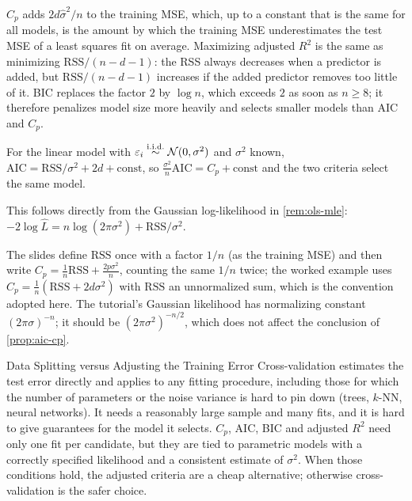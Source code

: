 $C_p$ adds $2d\hat\sigma^2/n$ to the training MSE, which, up to a constant that is the same for all models, is the amount by which the training MSE underestimates the test MSE of a least squares fit on average. Maximizing adjusted $R^2$ is the same as minimizing $\mathrm{RSS}/(n-d-1)$: the RSS always decreases when a predictor is added, but $\mathrm{RSS}/(n-d-1)$ increases if the added predictor removes too little of it. BIC replaces the factor $2$ by $\log n$, which exceeds $2$ as soon as $n\ge8$; it therefore penalizes model size more heavily and selects smaller models than AIC and $C_p$.

\begin{proposition}\label{prop:aic-cp}
For the linear model with $\varepsilon_i\stackrel{\mathrm{i.i.d.}}{\sim}\mathcal{N}(0,\sigma^2)$ and $\sigma^2$ known, $\mathrm{AIC}=\mathrm{RSS}/\sigma^2+2d+\text{const}$, so $\frac{\sigma^2}{n}\mathrm{AIC}=C_p+\text{const}$ and the two criteria select the same model.
\end{proposition}

This follows directly from the Gaussian log-likelihood in \cref{rem:ols-mle}: $-2\log\hat L=n\log(2\pi\sigma^2)+\mathrm{RSS}/\sigma^2$.

\begin{remark}
The slides define $\mathrm{RSS}$ once with a factor $1/n$ (as the training MSE) and then write $C_p=\frac1n\mathrm{RSS}+\frac{2p\sigma^2}{n}$, counting the same $1/n$ twice; the worked example uses $C_p=\frac1n(\mathrm{RSS}+2d\sigma^2)$ with $\mathrm{RSS}$ an unnormalized sum, which is the convention adopted here. The tutorial's Gaussian likelihood has normalizing constant $(2\pi\sigma)^{-n}$; it should be $(2\pi\sigma^2)^{-n/2}$, which does not affect the conclusion of \cref{prop:aic-cp}.
\end{remark}

\begin{notebox}{Data Splitting versus Adjusting the Training Error}
Cross-validation estimates the test error directly and applies to any fitting procedure, including those for which the number of parameters or the noise variance is hard to pin down (trees, $k$-NN, neural networks). It needs a reasonably large sample and many fits, and it is hard to give guarantees for the model it selects. $C_p$, AIC, BIC and adjusted $R^2$ need only one fit per candidate, but they are tied to parametric models with a correctly specified likelihood and a consistent estimate of $\sigma^2$. When those conditions hold, the adjusted criteria are a cheap alternative; otherwise cross-validation is the safer choice.
\end{notebox}


